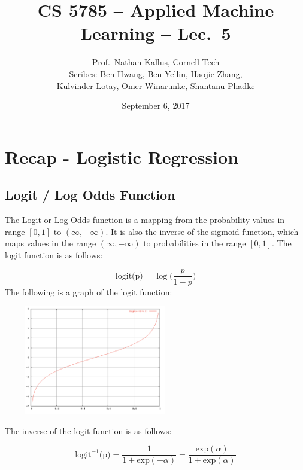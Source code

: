 \documentclass[a4paper]{article}
\title{CS 5785 -- Applied Machine Learning -- Lec.\ 5}
\author{Prof.\ Nathan Kallus, Cornell Tech\\Scribes: Ben Hwang, Ben Yellin, Haojie Zhang, \\Kulvinder Lotay, Omer Winarunke, Shantanu Phadke}
\date{September 6, 2017}
\begin{document}
\maketitle

\section{Recap - Logistic Regression}
\subsection{Logit / Log Odds Function}
The Logit or Log Odds function is a mapping from the probability values in range $[0,1]$ to $(\infty, -\infty)$. It is also the inverse of the sigmoid function, which maps values in the range $(\infty, -\infty)$ to probabilities in the range $[0, 1]$. The logit function is as follows:

\begin{equation}
    \text{logit(p)} = \log\Big(\frac{p}{1-p}\Big)
\end{equation}
The following is a graph of the logit function:
\begin{center}
\includegraphics[width=300px, height=180px]{logit_function.png}
\end{center}

The inverse of the logit function is as follows:

\begin{equation}
    \text{logit}^{-1}\text{(p)} = \frac{1}{1+\text{exp}(-\alpha)} = \frac{\text{exp}(\alpha)}{1+\text{exp}(\alpha)}
\end{equation}
\end{document}
